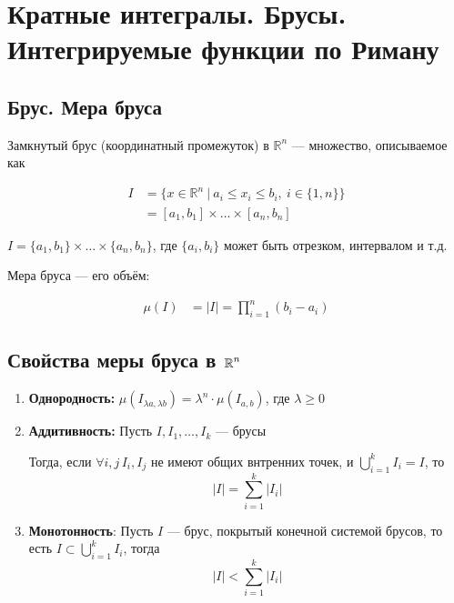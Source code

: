 \section{Кратные интегралы. Брусы. Интегрируемые функции по Риману}

\subsection{Брус. Мера бруса}

 Замкнутый брус (координатный промежуток) в $\mathbb{R}^n$ — множество, описываемое как



\begin{equation*}
\begin{aligned}
    I&=\{x\in\mathbb{R}^n\ |\ a_i\leq x_i\leq b_i,\ i\in\{1,n\}\}\\
    &=\left[a_1,b_1\right]\times\ldots\times\left[a_n,b_n\right]
\end{aligned}
\end{equation*}

\comment $I=\{a_1,b_1\}\times\ldots\times\{a_n,b_n\}$, где $\{a_i, b_i\}$ может быть отрезком, интервалом и т.д.

\begin{center}
    
\end{center}

 Мера бруса — его объём:

\begin{equation*}
    \begin{aligned}
        \mu(I)&=|I|
        =\prod_{i=1}^{n} (b_i-a_i)
    \end{aligned}
\end{equation*}

\subsection{Свойства меры бруса в $\operatorname{\mathbb{R}}^n$}

\begin{enumerate}
    \item \textbf{Однородность:} $\mu(I_{\lambda a,\lambda b})=\lambda^n\cdot\mu(I_{a,b})$, где $\lambda\geq
    0$
    \item \textbf{Аддитивность:} Пусть $I, I_1, \ldots, I_k$ — брусы
    
    Тогда, если $\forall i, j\, I_i, I_j$ не имеют общих внтренних точек, и $\displaystyle\bigcup_{i=1}^kI_i = I$, то
    $$|I| = \sum_{i=1}^k|I_i|$$
    \item \textbf{Монотонность}: Пусть $I$ — брус, покрытый конечной системой брусов, то есть $I\subset \displaystyle\bigcup_{i=1}^kI_i$, тогда
    $$|I| < \sum_{i=1}^k|I_i|$$
\end{enumerate}

